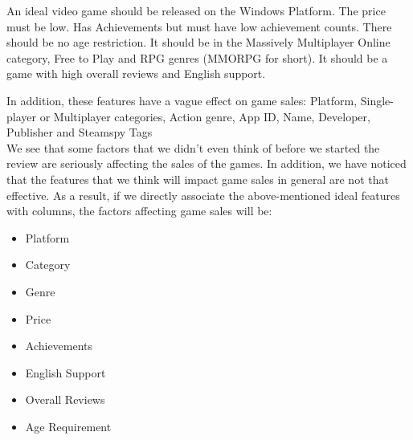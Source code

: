 \documentclass[conference]{IEEEtran}
\begin{document}
An ideal video game should be released on the Windows Platform. The price must be low. Has Achievements but must have low achievement counts. There should be no age restriction. It should be in the Massively Multiplayer Online category, Free to Play and RPG genres (MMORPG for short). It should be a game with high overall reviews and English support.

In addition, these features have a vague effect on game sales: Platform, Single-player or Multiplayer categories, Action genre, App ID, Name, Developer, Publisher and Steamspy Tags \\

We see that some factors that we didn't even think of before we started the review are seriously affecting the sales of the games. In addition, we have noticed that the features that we think will impact game sales in general are not that effective. As a result, if we directly associate the above-mentioned ideal features with columns, the factors affecting game sales will be:

\begin{itemize}
\item Platform
\item Category
\item Genre
\item Price
\item Achievements
\item English Support
\item Overall Reviews
\item Age Requirement
\end{itemize}
\end{document}

